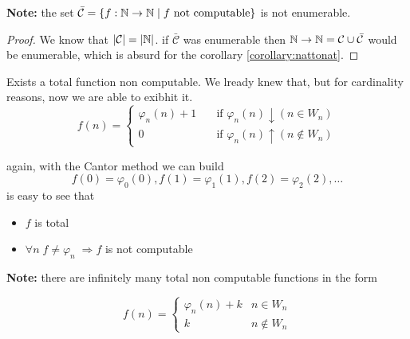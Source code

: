 \newcommand{\noc}{\bar{\mathcal{C}}}

\textbf{Note:} the set
$\noc = \{f : \nattonat \; | \; f \mbox{ not computable}\}$ is not
enumerable.

\begin{proof}
  We know that $|\mathcal{C}| = |\mathbb{N}|$. if $\noc$ was enumerable then
  $\nattonat = \mathcal{C} \cup \noc$ would be enumerable, which is
  absurd for the corollary \ref{corollary:nattonat}.
\end{proof}

\begin{exercise}
  Exists a total function non computable. We lready knew that, but for
  cardinality reasons, now we are able to exibhit it.
  \[
    f(n) = \begin{cases}

      \varphi_n(n) + 1 & \quad \mbox{if } \varphi_n(n) \downarrow (n
      \in W_n) \\

       0 & \quad \mbox{if } \varphi_n(n)\uparrow (n \notin W_n)
    \end{cases}
  \]

  again, with the Cantor method we can build
  \[f(0) = \varphi_0(0), f(1) = \varphi_1(1), f(2) = \varphi_2(2),
    \dots \]
  is easy to see that
  \begin{itemize}
  \item $f$ is total
  \item $\forall n \; f \neq \varphi_n \; \Rightarrow f$ is not
    computable
  \end{itemize}
\end{exercise}

\textbf{Note:} there are infinitely many total non computable
functions in the form

\[
  f(n)  = \begin{cases}
    \varphi_n(n) + k & n \in W_n \\
    k & n \notin W_n
  \end{cases}
\]


